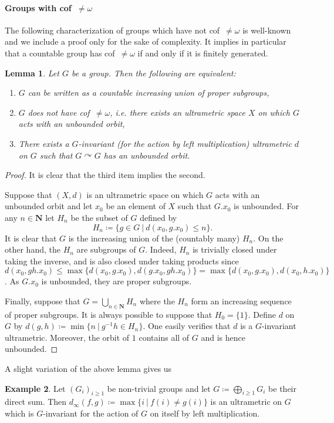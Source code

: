\documentclass[a4paper]{article}
\newtheorem{lem}{Lemma}[section]
\theoremstyle{definition}
\newtheorem{exmp}[lem]{Example}
\newcommand*{\field}[1]{\mathbf{#1}}
\newcommand*{\N}{\field{N}}
\newcommand{\setst}[2]{\{#1\ |\ #2\}}
\begin{document}
\paragraph{Groups with cof~$\neq\omega$}
The following characterization of groups which have not cof~$\neq\omega$ is well-known and we include a proof only for the sake of complexity.
It implies in particular that a countable group has cof~$\neq\omega$ if and only if it is finitely generated.
%
%
\begin{lem}\label{Lemma:CofSub}
Let $G$ be a group. Then the following are equivalent:
\begin{enumerate}
\item $G$ can be written as a countable increasing union of proper subgroups,
\item $G$ does not have cof~$\neq\omega$, i.e. there exists an ultrametric space $X$ on which $G$ acts with an unbounded orbit,
\item There exists a $G$-invariant (for the action by left multiplication) ultrametric $d$ on $G$ such that $G\curvearrowright G$ has an unbounded orbit.
\end{enumerate}
\end{lem}
\begin{proof}
It is clear that the third item implies the second.

Suppose that $(X,d)$ is an ultrametric space on which $G$ acts with an unbounded orbit and let $x_0$ be an element of $X$ such that $G.x_0$ is unbounded. For any $n\in \N$ let $H_n$ be the subset of $G$ defined by
\[
	H_n\coloneqq\setst{g\in G}{d(x_0,g.x_0)\leq n}.
\]
It is clear that $G$ is the increasing union of the (countably many) $H_n$.
On the other hand, the $H_n$ are subgroups of $G$. Indeed, $H_n$ is trivially closed under taking the inverse, and is also closed under taking products since $d(x_0,gh.x_0)\leq\max\{d(x_0,g.x_0),d(g.x_0,gh.x_0)\}=\max\{d(x_0,g.x_0),d(x_0,h.x_0)\}$. As $G.x_0$ is unbounded, they are proper subgroups.

Finally, suppose that $G=\bigcup_{n\in \N}H_n$ where the $H_n$ form an increasing sequence of proper subgroups. It is always possible to suppose that $H_0=\{1\}$.
Define $d$ on $G$ by $d(g,h)\coloneqq\min\setst{n}{g^{-1}h\in H_n}$.
One easily verifies that $d$ is a $G$-invariant ultrametric. Moreover, the orbit of $1$ contains all of $G$ and is hence unbounded.
\end{proof}
%
%
A slight variation of the above lemma gives us
\begin{exmp}\label{Exmpl:Ultra}
Let $(G_i)_{i\geq 1}$ be non-trivial groups and let $G\coloneqq\bigoplus_{i\geq 1} G_i$ be their direct sum.
Then $d_\infty(f,g)\coloneqq\max\setst{i}{f(i)\neq g(i)}$ is an ultrametric on $G$ which is $G$-invariant for the action of $G$ on itself by left multiplication.
\end{exmp}
%
%
%
%
%
%
%
%
%
%
\end{document}
